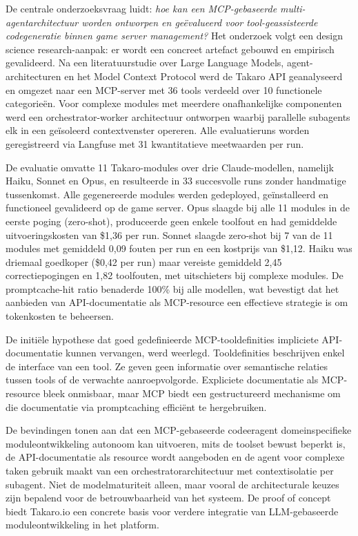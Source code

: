 De centrale onderzoeksvraag luidt: \textit{hoe kan een MCP-gebaseerde multi-agentarchitectuur worden ontworpen en geëvalueerd voor tool-geassisteerde codegeneratie binnen game server management?} Het onderzoek volgt een design science research-aanpak: er wordt een concreet artefact gebouwd en empirisch gevalideerd. Na een literatuurstudie over Large Language Models, agent-architecturen en het Model Context Protocol werd de Takaro API geanalyseerd en omgezet naar een MCP-server met 36 tools verdeeld over 10 functionele categorieën. Voor complexe modules met meerdere onafhankelijke componenten werd een orchestrator-worker architectuur ontworpen waarbij parallelle subagents elk in een geïsoleerd contextvenster opereren. Alle evaluatieruns worden geregistreerd via Langfuse met 31 kwantitatieve meetwaarden per run.

De evaluatie omvatte 11 Takaro-modules over drie Claude-modellen, namelijk Haiku, Sonnet en Opus, en resulteerde in 33 succesvolle runs zonder handmatige tussenkomst. Alle gegenereerde modules werden gedeployed, geïnstalleerd en functioneel gevalideerd op de game server. Opus slaagde bij alle 11 modules in de eerste poging (zero-shot), produceerde geen enkele toolfout en had gemiddelde uitvoeringskosten van \$1,36 per run. Sonnet slaagde zero-shot bij 7 van de 11 modules met gemiddeld 0,09 fouten per run en een kostprijs van \$1,12. Haiku was driemaal goedkoper (\$0,42 per run) maar vereiste gemiddeld 2,45 correctiepogingen en 1,82 toolfouten, met uitschieters bij complexe modules. De promptcache-hit ratio benaderde 100\% bij alle modellen, wat bevestigt dat het aanbieden van API-documentatie als MCP-resource een effectieve strategie is om tokenkosten te beheersen.

De initiële hypothese dat goed gedefinieerde MCP-tooldefinities impliciete API-documentatie kunnen vervangen, werd weerlegd. Tooldefinities beschrijven enkel de interface van een tool. Ze geven geen informatie over semantische relaties tussen tools of de verwachte aanroepvolgorde. Expliciete documentatie als MCP-resource bleek onmisbaar, maar MCP biedt een gestructureerd mechanisme om die documentatie via promptcaching efficiënt te hergebruiken.

De bevindingen tonen aan dat een MCP-gebaseerde codeeragent domeinspecifieke moduleontwikkeling autonoom kan uitvoeren, mits de toolset bewust beperkt is, de API-documentatie als resource wordt aangeboden en de agent voor complexe taken gebruik maakt van een orchestratorarchitectuur met contextisolatie per subagent. Niet de modelmaturiteit alleen, maar vooral de architecturale keuzes zijn bepalend voor de betrouwbaarheid van het systeem. De proof of concept biedt Takaro.io een concrete basis voor verdere integratie van LLM-gebaseerde moduleontwikkeling in het platform.
